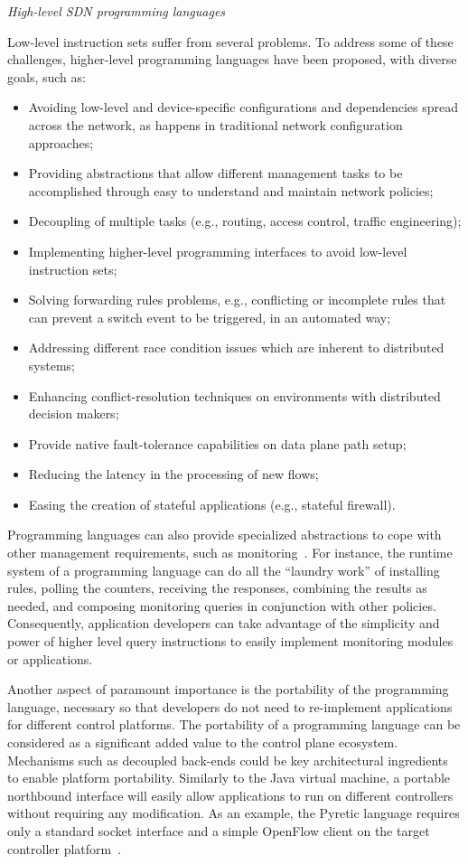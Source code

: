 \vspace{2mm}
\noindent \textit{High-level SDN programming languages}


Low-level instruction sets suffer from several problems.
To address some of these challenges, higher-level programming languages have been proposed, with 
diverse goals, such as:
\begin{itemize}
\item Avoiding low-level and device-specific configurations and dependencies spread across the network, as happens
in traditional network configuration approaches; 
\item Providing abstractions that allow different management tasks to be accomplished through easy to understand and maintain network policies;
\item Decoupling of multiple tasks (e.g., routing, access control, traffic engineering);
\item Implementing higher-level programming interfaces to avoid low-level instruction sets;
\item Solving forwarding rules problems, e.g., conflicting or incomplete rules that can prevent a switch event to be triggered, in an automated way;
\item Addressing different race condition issues which are inherent to distributed systems;
\item Enhancing conflict-resolution techniques on environments with distributed decision makers;
\item Provide native fault-tolerance capabilities on data plane path setup;
\item Reducing the latency in the processing of new flows;
\item Easing the creation of stateful applications (e.g., stateful firewall).
\end{itemize}

Programming languages can also provide specialized abstractions to cope with other management requirements, 
such as monitoring~\cite{voellmy2012,foster2011,tootoonchian2010-1}.
For instance, the runtime system of a programming language can do all the ``laundry work'' of installing rules, polling 
the counters, receiving the responses, combining the results as needed, and composing monitoring queries in 
conjunction with other policies. Consequently, application developers can take advantage of the simplicity and 
power of higher level query instructions to easily implement monitoring modules or applications.

Another aspect of paramount importance is the portability of the programming language, necessary so that developers do not 
need to re-implement applications for different control platforms.
The portability of a programming language can be considered as a significant added value to the control plane ecosystem. 
Mechanisms such as decoupled back-ends could be key architectural ingredients to enable platform portability.
Similarly to the Java virtual machine, a portable northbound interface will easily allow applications to run on different controllers without requiring any modification.
As an example, the Pyretic language requires only a standard socket interface and a simple OpenFlow client on the target controller 
platform~\cite{monsanto2013}.

